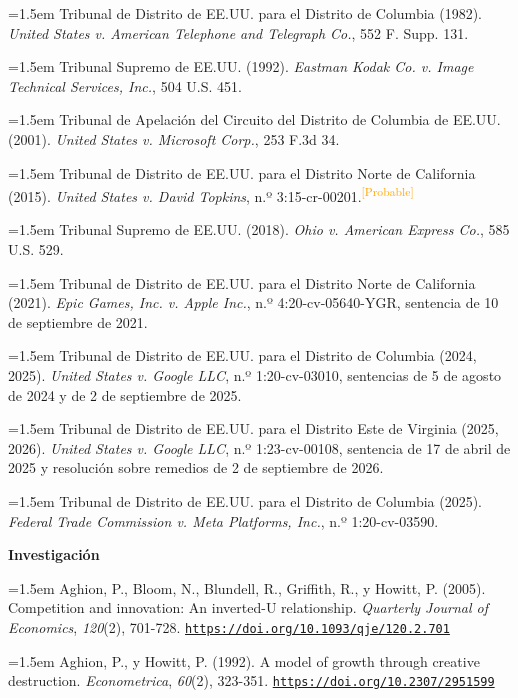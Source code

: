 \documentclass[10pt,a4paper]{article}
\begin{document}
\noindent\hangindent=1.5em Tribunal de Distrito de EE.UU. para el Distrito de Columbia (1982). \textit{United States v. American Telephone and Telegraph Co.}, 552 F. Supp. 131.

\noindent\hangindent=1.5em Tribunal Supremo de EE.UU. (1992). \textit{Eastman Kodak Co. v. Image Technical Services, Inc.}, 504 U.S. 451.

\noindent\hangindent=1.5em Tribunal de Apelación del Circuito del Distrito de Columbia de EE.UU. (2001). \textit{United States v. Microsoft Corp.}, 253 F.3d 34.

\noindent\hangindent=1.5em Tribunal de Distrito de EE.UU. para el Distrito Norte de California (2015). \textit{United States v. David Topkins}, n.º 3:15-cr-00201.\textcolor{orange}{\textsuperscript{[Probable]}}

\noindent\hangindent=1.5em Tribunal Supremo de EE.UU. (2018). \textit{Ohio v. American Express Co.}, 585 U.S. 529.

\noindent\hangindent=1.5em Tribunal de Distrito de EE.UU. para el Distrito Norte de California (2021). \textit{Epic Games, Inc. v. Apple Inc.}, n.º 4:20-cv-05640-YGR, sentencia de 10 de septiembre de 2021.

\noindent\hangindent=1.5em Tribunal de Distrito de EE.UU. para el Distrito de Columbia (2024, 2025). \textit{United States v. Google LLC}, n.º 1:20-cv-03010, sentencias de 5 de agosto de 2024 y de 2 de septiembre de 2025.

\noindent\hangindent=1.5em Tribunal de Distrito de EE.UU. para el Distrito Este de Virginia (2025, 2026). \textit{United States v. Google LLC}, n.º 1:23-cv-00108, sentencia de 17 de abril de 2025 y resolución sobre remedios de 2 de septiembre de 2026.

\noindent\hangindent=1.5em Tribunal de Distrito de EE.UU. para el Distrito de Columbia (2025). \textit{Federal Trade Commission v. Meta Platforms, Inc.}, n.º 1:20-cv-03590.

\textbf{Investigación}

\noindent\hangindent=1.5em Aghion, P., Bloom, N., Blundell, R., Griffith, R., y Howitt, P. (2005). Competition and innovation: An inverted-U relationship. \textit{Quarterly Journal of Economics}, \textit{120}(2), 701-728. \href{https://doi.org/10.1093/qje/120.2.701}{\nolinkurl{https://doi.org/10.1093/qje/120.2.701}}

\noindent\hangindent=1.5em Aghion, P., y Howitt, P. (1992). A model of growth through creative destruction. \textit{Econometrica}, \textit{60}(2), 323-351. \href{https://doi.org/10.2307/2951599}{\nolinkurl{https://doi.org/10.2307/2951599}}
\end{document}
